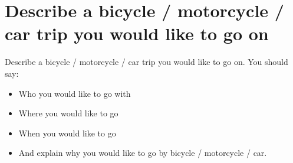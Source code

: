 \section{Describe a bicycle / motorcycle / car trip you would like to go on}
\begin{ieltsprompt}
Describe a bicycle / motorcycle / car trip you would like to go on.
You should say:
\begin{itemize}[leftmargin=2em, itemsep=2pt]
\item Who you would like to go with
\item Where you would like to go
\item When you would like to go
\item And explain why you would like to go by bicycle / motorcycle / car.
\end{itemize}
\end{ieltsprompt}
